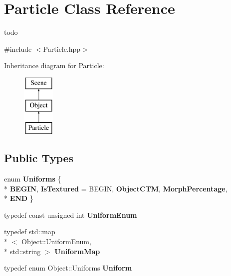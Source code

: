 \hypertarget{class_particle}{\section{Particle Class Reference}
\label{class_particle}
}


todo  




{\ttfamily \#include $<$Particle.\-hpp$>$}

Inheritance diagram for Particle\-:\begin{figure}[H]
\begin{center}
\leavevmode
\includegraphics[height=3.000000cm]{class_particle}
\end{center}
\end{figure}
\subsection*{Public Types}
\begin{DoxyCompactItemize}
\item 
enum {\bfseries Uniforms} \{ \\*
{\bfseries B\-E\-G\-I\-N}, 
{\bfseries Is\-Textured} = B\-E\-G\-I\-N, 
{\bfseries Object\-C\-T\-M}, 
{\bfseries Morph\-Percentage}, 
\\*
{\bfseries E\-N\-D}
 \}
\item 
\hypertarget{class_object_a79b74057dbc5182b85c9c3ba8480fcf2}{typedef const unsigned int {\bfseries Uniform\-Enum}}\label{class_object_a79b74057dbc5182b85c9c3ba8480fcf2}

\item 
\hypertarget{class_object_a6e19bd8516360bff956408cbae33b878}{typedef std\-::map\\*
$<$ Object\-::\-Uniform\-Enum, \\*
std\-::string $>$ {\bfseries Uniform\-Map}}\label{class_object_a6e19bd8516360bff956408cbae33b878}

\item 
\hypertarget{class_object_ae6a2969ddca87d2c54b7cb1c131a7d60}{typedef enum Object\-::\-Uniforms {\bfseries Uniform}}\label{class_object_ae6a2969ddca87d2c54b7cb1c131a7d60}

\end{DoxyCompactItemize}
